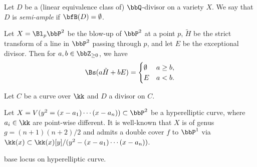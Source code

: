  \begin{definition}
    Let $D$ be a (linear equivalence class of) $\bbQ$-divisor on a variety $X$.
    We say that $D$ is \emph{semi-ample} if $\bfB(D) = \emptyset$.
  \end{definition}

  
  \begin{example}
    Let $X = \Bl_p \bbP^2$ be the blow-up of $\bbP^2$ at a point $p$, $\tilde{H}$ be the strict transform of a line in $\bbP^2$ passing through $p$, and let $E$ be the exceptional divisor.
    Then for $a,b \in \bbZ_{\geq 0}$, we have
    \[ \Bs(a\tilde{H} + bE) = \begin{cases}
      \emptyset & a \geq b, \\
      E & a < b.
    \end{cases} \]
  \end{example}

  \begin{example}
    Let $C$ be a curve over $\kk$ and $D$ a divisor on $C$.


    Let $X = V(y^2=(x-a_1)\cdots (x-a_n)) \subset \bbP^2$ be a hyperelliptic curve, where $a_i \in \kk$ are point-wise different.
    It is well-known that $X$ is of genus $g = (n+1)(n+2)/2$ and admits a double cover $f$ to $\bbP^1$ via $\kk(x) \subset \kk(x)[y]/(y^2-(x-a_1)\cdots (x-a_n))$.


    base locus on hyperelliptic curve.

    \Yang{}
  \end{example}

